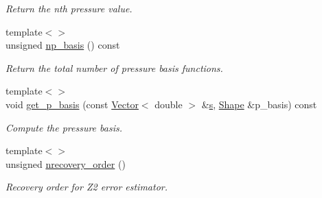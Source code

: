 \begin{DoxyCompactItemize}
\begin{DoxyCompactList}\small\item\em Return the nth pressure value. \end{DoxyCompactList}\item 
{\footnotesize template$<$$>$ }\\unsigned \hyperlink{classoomph_1_1TRaviartThomasDarcyElement_a1717d9e302ead84ad212bafd1cb86c9e}{np\+\_\+basis} () const
\begin{DoxyCompactList}\small\item\em Return the total number of pressure basis functions. \end{DoxyCompactList}\item 
{\footnotesize template$<$$>$ }\\void \hyperlink{classoomph_1_1TRaviartThomasDarcyElement_a745f700fb01e94a3ccfb75faeb2f22c2}{get\+\_\+p\+\_\+basis} (const \hyperlink{classoomph_1_1Vector}{Vector}$<$ double $>$ \&\hyperlink{cfortran_8h_ab7123126e4885ef647dd9c6e3807a21c}{s}, \hyperlink{classoomph_1_1Shape}{Shape} \&p\+\_\+basis) const
\begin{DoxyCompactList}\small\item\em Compute the pressure basis. \end{DoxyCompactList}\item 
{\footnotesize template$<$$>$ }\\unsigned \hyperlink{classoomph_1_1TRaviartThomasDarcyElement_a95e48e5070eeb89215bfb39c1d9c5989}{nrecovery\+\_\+order} ()
\begin{DoxyCompactList}\small\item\em Recovery order for Z2 error estimator. \end{DoxyCompactList}\end{DoxyCompactItemize}
